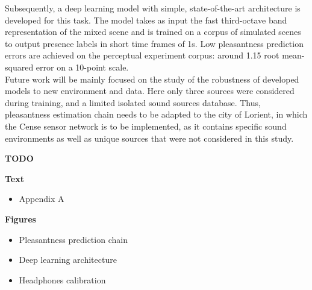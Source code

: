 \documentclass[11pt,a4paper]{article}
\begin{document}
Subsequently, a deep learning model with simple, state-of-the-art architecture is developed for this task. The model takes as input the fast third-octave band representation of the mixed scene and is trained on a corpus of simulated scenes to output presence labels in short time frames of 1s. Low pleasantness prediction errors are achieved on the perceptual experiment corpus: around 1.15 root mean-squared error on a 10-point scale.\\

Future work will be mainly focused on the study of the robustness of developed models to new environment and data. Here only three sources were considered during training, and a limited isolated sound sources database. Thus, pleasantness estimation chain needs to be adapted to the city of Lorient, in which the Cense sensor network is to be implemented, as it contains specific sound environments as well as unique sources that were not considered in this study.

\clearpage

\textbf{TODO}


\textbf{Text}

\begin{itemize}
\item Appendix A
\end{itemize}

\textbf{Figures}

\begin{itemize}
\item Pleasantness prediction chain
\item Deep learning architecture
\item Headphones calibration
\end{itemize}

\clearpage












\end{document}
